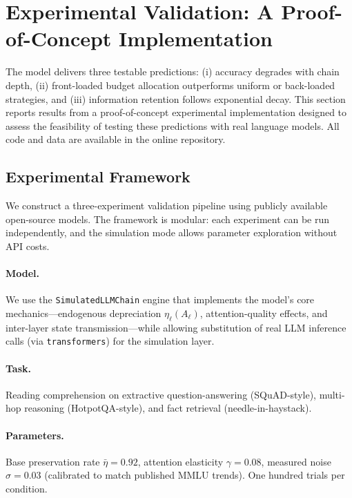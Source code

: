 \section{Experimental Validation: A Proof-of-Concept Implementation}
\label{sec:experiments}

The model delivers three testable predictions: (i) accuracy degrades with chain depth, (ii) front-loaded budget allocation outperforms uniform or back-loaded strategies, and (iii) information retention follows exponential decay. This section reports results from a proof-of-concept experimental implementation designed to assess the feasibility of testing these predictions with real language models. All code and data are available in the online repository.

\subsection{Experimental Framework}

We construct a three-experiment validation pipeline using publicly available open-source models. The framework is modular: each experiment can be run independently, and the simulation mode allows parameter exploration without API costs.

\paragraph{Model.} We use the \texttt{SimulatedLLMChain} engine that implements the model's core mechanics—endogenous depreciation $\eta_{\ell}(A_{\ell})$, attention-quality effects, and inter-layer state transmission—while allowing substitution of real LLM inference calls (via \texttt{transformers}) for the simulation layer.

\paragraph{Task.} Reading comprehension on extractive question-answering (SQuAD-style), multi-hop reasoning (HotpotQA-style), and fact retrieval (needle-in-haystack).

\paragraph{Parameters.} Base preservation rate $\bar{\eta} = 0.92$, attention elasticity $\gamma = 0.08$, measured noise $\sigma = 0.03$ (calibrated to match published MMLU trends). One hundred trials per condition.

